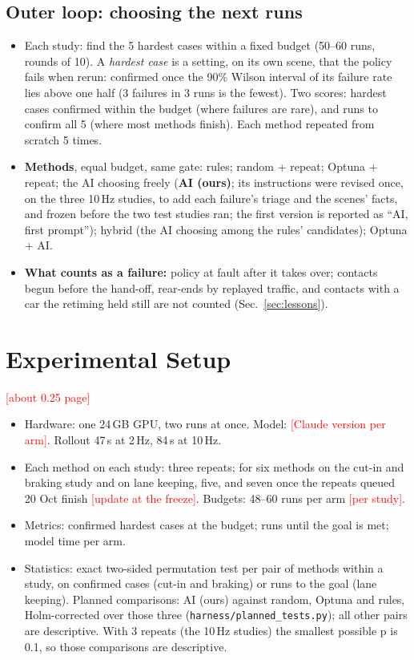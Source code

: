 \documentclass[conference]{IEEEtran}
\newcommand{\pending}[1]{\textcolor{red}{[#1]}}
\begin{document}
\subsection{Outer loop: choosing the next runs}
\begin{itemize}
\item Each study: find the 5 hardest cases within a fixed budget (50--60 runs, rounds of 10). A \emph{hardest case} is a setting, on its own scene, that the policy fails when rerun: confirmed once the 90\% Wilson interval of its failure rate lies above one half (3 failures in 3 runs is the fewest). Two scores: hardest cases confirmed within the budget (where failures are rare), and runs to confirm all 5 (where most methods finish). Each method repeated from scratch 5 times.
\item \textbf{Methods}, equal budget, same gate: rules; random + repeat; Optuna + repeat; the AI choosing freely (\textbf{AI (ours)}; its instructions were revised once, on the three 10\,Hz studies, to add each failure's triage and the scenes' facts, and frozen before the two test studies ran; the first version is reported as ``AI, first prompt''); hybrid (the AI choosing among the rules' candidates); Optuna + AI.
\item \textbf{What counts as a failure:} policy at fault after it takes over; contacts begun before the hand-off, rear-ends by replayed traffic, and contacts with a car the retiming held still are not counted (Sec.~\ref{sec:lessons}).
\end{itemize}

\section{Experimental Setup}\label{sec:setup}
\pending{about 0.25 page}
\begin{itemize}
\item Hardware: one 24\,GB GPU, two runs at once. Model: \pending{Claude version per arm}. Rollout 47\,s at 2\,Hz, 84\,s at 10\,Hz.
\item Each method on each study: three repeats; for six methods on the cut-in and braking study and on lane keeping, five, and seven once the repeats queued 20 Oct finish \pending{update at the freeze}. Budgets: 48--60 runs per arm \pending{per study}.
\item Metrics: confirmed hardest cases at the budget; runs until the goal is met; model time per arm.
\item Statistics: exact two-sided permutation test per pair of methods within a study, on confirmed cases (cut-in and braking) or runs to the goal (lane keeping). Planned comparisons: AI (ours) against random, Optuna and rules, Holm-corrected over those three (\texttt{harness/planned\_tests.py}); all other pairs are descriptive. With 3 repeats (the 10\,Hz studies) the smallest possible p is 0.1, so those comparisons are descriptive.
\end{itemize}
\end{document}
